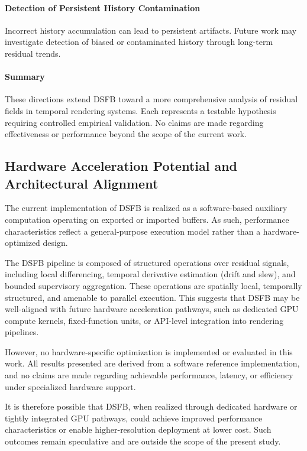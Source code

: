 \documentclass[11pt,letterpaper]{article}
\theoremstyle{gcresult}
\theoremstyle{definition}
\begin{document}
\paragraph{Detection of Persistent History Contamination}
Incorrect history accumulation can lead to persistent artifacts. Future work may investigate detection of biased or contaminated history through long-term residual trends.

\paragraph{Summary}
These directions extend DSFB toward a more comprehensive analysis of residual fields in temporal rendering systems. Each represents a testable hypothesis requiring controlled empirical validation. No claims are made regarding effectiveness or performance beyond the scope of the current work.

\subsection{Hardware Acceleration Potential and Architectural Alignment}

The current implementation of DSFB is realized as a software-based auxiliary computation operating on exported or imported buffers. As such, performance characteristics reflect a general-purpose execution model rather than a hardware-optimized design.

The DSFB pipeline is composed of structured operations over residual signals, including local differencing, temporal derivative estimation (drift and slew), and bounded supervisory aggregation. These operations are spatially local, temporally structured, and amenable to parallel execution. This suggests that DSFB may be well-aligned with future hardware acceleration pathways, such as dedicated GPU compute kernels, fixed-function units, or API-level integration into rendering pipelines.

However, no hardware-specific optimization is implemented or evaluated in this work. All results presented are derived from a software reference implementation, and no claims are made regarding achievable performance, latency, or efficiency under specialized hardware support.

It is therefore possible that DSFB, when realized through dedicated hardware or tightly integrated GPU pathways, could achieve improved performance characteristics or enable higher-resolution deployment at lower cost. Such outcomes remain speculative and are outside the scope of the present study.
\end{document}
